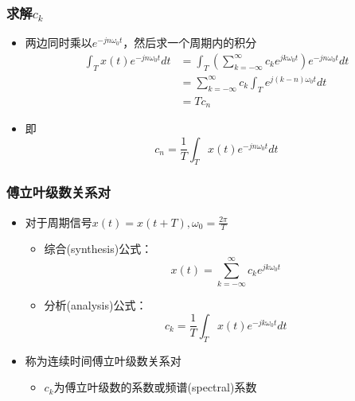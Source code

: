 \documentclass[CJKutf8,xcolor=pdftex,dvipsnames,table]{beamer}
\begin{document}
\begin{CJK*}{UTF8}{song}
  \begin{frame}
    \frametitle{求解$c_k$}
    \begin{itemize}
    \item 两边同时乘以$e^{-jn\omega_0 t}$，然后求一个周期内的积分
        \begin{align*}
 		\int_T x(t) e^{-jn\omega_0 t} dt & = \int_T (\sum_{k=-\infty}^{\infty}c_k e^{jk\omega_0 t}) e^{-jn\omega_0 t} dt \\
		& = \sum_{k=-\infty}^{\infty}c_k \int_T e^{j(k-n)\omega_0 t} dt \\
		& = Tc_n
    	\end{align*}
	\item 即
	\[
	c_n = \frac{1}{T}\int_T x(t) e^{-jn\omega_0 t} dt
	\]	    
    \end{itemize}      
  \end{frame}
    
  \begin{frame}
    \frametitle{傅立叶级数关系对}
    \begin{itemize}   
    	\item 对于周期信号$x(t)=x(t+T), \omega_0=\frac{2\pi}{T}$     

	    \begin{itemize}
    		\item 综合(synthesis)公式：\[ x(t)=\sum_{k=-\infty}^{\infty}c_k e^{jk\omega_0 t} \]
			\item 分析(analysis)公式：\[ c_k=\frac{1}{T}\int_{T}x(t)e^{-jk\omega_0 t}dt \]
    	\end{itemize}   
	    \item 称为{\color{red}连续时间傅立叶级数关系对}
	    	\begin{itemize}
		    \item $c_k$为傅立叶级数的系数或频谱(spectral)系数
		    \end{itemize}

    \end{itemize}   
  \end{frame}
       

\end{CJK*}
\end{document}
